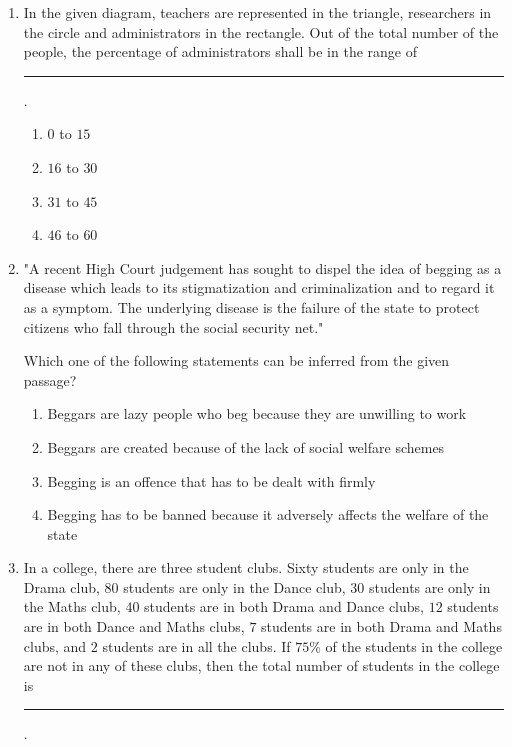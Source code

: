 \documentclass[journal]{IEEEtran}
\begin{document}
\begin{enumerate}
    \item In the given diagram, teachers are represented in the triangle, researchers in the circle and administrators in the rectangle. Out of the total number of the people, the percentage of administrators shall be in the range of \rule{1cm}{0.1mm} .
    

\begin{multicols}{4}
    \begin{enumerate}
        \item $0$ to $15$
        \item $16$ to $30$
        \item $31$ to $45$
        \item $46$ to $60$
    \end{enumerate}
\end{multicols}

    \item "A recent High Court judgement has sought to dispel the idea of begging as a disease which leads to its stigmatization and criminalization and to regard it as a symptom. The underlying disease is the failure of the state to protect citizens who fall through the social security net."

Which one of the following statements can be inferred from the given passage?

    \begin{enumerate}
        \item Beggars are lazy people who beg because they are unwilling to work
        \item Beggars are created because of the lack of social welfare schemes
        \item Begging is an offence that has to be dealt with firmly
        \item Begging has to be banned because it adversely affects the welfare of the state
    \end{enumerate}
    \bigskip
    \item In a college, there are three student clubs. Sixty students are only in the Drama club, $80$ students are only in the Dance club, $30$ students are only in the Maths club, $40$ students are in both Drama and Dance clubs, $12$ students are in both Dance and Maths clubs, $7$ students are in both Drama and Maths clubs, and $2$ students are in all the clubs. If $75$\% of the students in the college are not in any of these clubs, then the total number of students in the college is \rule{1cm}{0.1mm}.


\end{enumerate}
\end{document}
